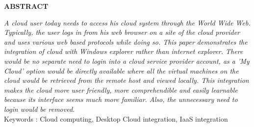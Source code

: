 \begin{center}
\thispagestyle{empty}
\vspace*{4\baselineskip}
\LARGE{\textbf{ABSTRACT}}\\[1.0cm]
\end{center}
\thispagestyle{empty}
\large{\emph{
A cloud user today needs to access his cloud system through the World Wide Web. Typically, the user logs in from his web browser on a site of the cloud provider and uses various web based protocols while doing so. This paper demonstrates the integration of cloud with Windows explorer rather than internet explorer. There would be no separate need to login into a cloud service provider account, as a 'My Cloud' option would be directly available where all the virtual machines on the cloud would be retrieved from the remote host and viewed locally. This integration makes the cloud more user friendly, more comprehendible and easily learnable because its interface seems much more familiar. Also, the unnecessary need to login would be removed.
\\[1cm]}}
Keywords : Cloud computing, Desktop Cloud integration, IaaS integration